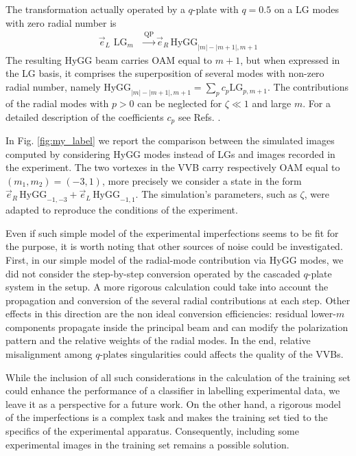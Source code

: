 \documentclass[
    floatfix, aps, pra, superscriptaddress,
	10pt, twocolumn,
    nofootinbib,
	tightenlines
]{revtex4-1}
\begin{document}
The transformation actually operated by a $q$-plate with $q=0.5$ on a LG modes with zero radial number is 
\cite{Karimi:09}
\begin{align}
  \Vec{e}_L \text{ LG}_m &\stackrel{\text{QP}}{\longrightarrow} \Vec{e}_R\,\text{HyGG}_{|m|-|m+1|,m+1}   
\end{align}
The resulting HyGG beam carries OAM equal to $m+1$, but when expressed in the LG basis, it comprises the superposition of several modes with non-zero radial number, namely $\text{HyGG}_{|m|-|m+1|,m+1}=\sum_p c_p \text{LG}_{p,m+1}$. The contributions of the radial modes with $p>0$ can be neglected for $\zeta \ll 1$ and large $m$. For a detailed description of the coefficients $c_p$ see Refs. \cite{Karimi:07,Karimi:09, cardano2015quantum}.

In Fig. \ref{fig:my_label} we report the comparison between the simulated images computed by considering HyGG modes instead of LGs and images recorded in the experiment. The two vortexes in the VVB carry respectively OAM equal to $(m_1,m_2)=(-3,1)$, more precisely we consider a state in the form $ \Vec{e}_R\,\text{HyGG}_{-1,-3}+\Vec{e}_L\,\text{HyGG}_{-1,1}$. The simulation's parameters, such as $\zeta$, were adapted to reproduce the conditions of the experiment.


Even if such simple model of the experimental imperfections seems to be fit for the purpose, it is worth noting that other sources of noise could be investigated. First, in our simple model of the radial-mode contribution via HyGG modes, we did not consider the step-by-step conversion 
operated by the cascaded $q$-plate system in the setup. A more rigorous calculation could take into account the propagation and conversion of the several radial contributions at each step. Other effects in this direction are the non ideal conversion efficiencies: residual lower-$m$ components propagate inside the principal beam and can modify the polarization pattern and the relative weights of the radial modes. In the end, relative misalignment among $q$-plates singularities could affects the quality of the VVBs.


While the inclusion of all such considerations in the calculation of the training set could enhance the performance of a classifier in labelling experimental data, we leave it as a  perspective for a future work. On the other hand, a rigorous model of the imperfections is a complex task and makes the training set tied to the specifics of the experimental apparatus. Consequently, including some experimental images in the training set remains a possible solution.
\end{document}
